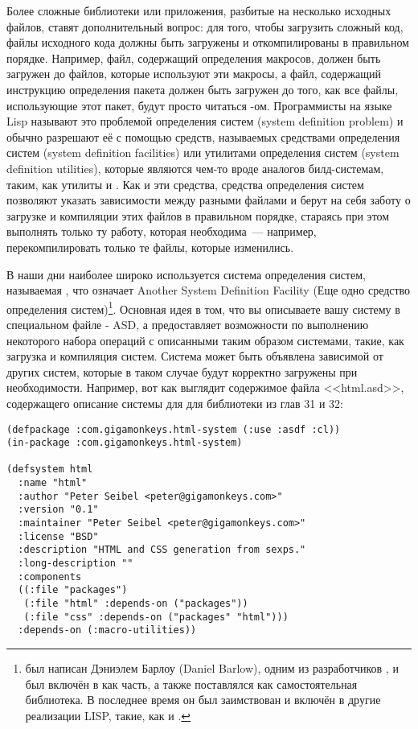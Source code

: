 Более сложные библиотеки или приложения, разбитые на несколько исходных файлов, ставят
дополнительный вопрос: для того, чтобы загрузить сложный код, файлы исходного кода должны
быть загружены и откомпилированы в правильном порядке. Например, файл, содержащий
определения макросов, должен быть загружен до файлов, которые используют эти макросы, а
файл, содержащий инструкцию определения пакета  должен быть загружен до
того, как все файлы, использующие этот пакет, будут просто читаться
-ом. Программисты на языке Lisp называют это проблемой определения систем
(system definition problem) и обычно разрешают её с помощью средств, называемых средствами
определения систем (system definition facilities) или утилитами определения систем (system
definition utilities), которые являются чем-то вроде аналогов билд-системам, таким, как
утилиты  и . Как и эти средства, средства определения систем
позволяют указать зависимости между разными файлами и берут на себя заботу о загрузке и
компиляции этих файлов в правильном порядке, стараясь при этом выполнять только ту работу,
которая необходима~--- например, перекомпилировать только те файлы, которые изменились.

В наши дни наиболее широко используется система определения систем, называемая
, что означает Another System Definition Facility (Еще одно средство
определения систем)\footnote{ был написан Дэниэлем Барлоу (Daniel Barlow),
  одним из разработчиков , и был включён в  как часть, а также
  поставлялся как самостоятельная библиотека. В последнее время он был заимствован и
  включён в другие реализации LISP, такие, как  и .}. Основная
идея  в том, что вы описываете вашу систему в специальном файле - ASD, а
 предоставляет возможности по выполнению некоторого набора операций с
описанными таким образом системами, такие, как загрузка и компиляция систем. Система может
быть объявлена зависимой от других систем, которые в таком случае будут корректно
загружены при необходимости. Например, вот как выглядит содержимое файла <<html.asd>>,
содержащего описание системы для  для библиотеки  из глав 31 и 32:

\begin{lstlisting}
(defpackage :com.gigamonkeys.html-system (:use :asdf :cl))
(in-package :com.gigamonkeys.html-system)

(defsystem html
  :name "html"
  :author "Peter Seibel <peter@gigamonkeys.com>"
  :version "0.1"
  :maintainer "Peter Seibel <peter@gigamonkeys.com>"
  :license "BSD"
  :description "HTML and CSS generation from sexps."
  :long-description ""
  :components
  ((:file "packages")
   (:file "html" :depends-on ("packages"))
   (:file "css" :depends-on ("packages" "html")))
  :depends-on (:macro-utilities))
\end{lstlisting}

